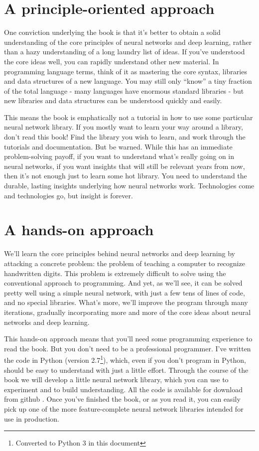 \section*{A principle-oriented approach}

One conviction underlying the book is that it's better to obtain a solid understanding of the core principles of neural networks and deep learning, rather than a hazy understanding of a long laundry list of ideas. If you've understood the core ideas well, you can rapidly understand other new material. In programming language terms, think of it as mastering the core syntax, libraries and data structures of a new language. You may still only ``know'' a tiny fraction of the total language - many languages have enormous standard libraries - but new libraries and data structures can be understood quickly and easily.

This means the book is emphatically not a tutorial in how to use some particular neural network library. If you mostly want to learn your way around a library, don't read this book! Find the library you wish to learn, and work through the tutorials and documentation. But be warned. While this has an immediate problem-solving payoff, if you want to understand what's really going on in neural networks, if you want insights that will still be relevant years from now, then it's not enough just to learn some hot library. You need to understand the durable, lasting insights underlying how neural networks work. Technologies come and technologies go, but insight is forever.

\section*{A hands-on approach}

We'll learn the core principles behind neural networks and deep learning by attacking a concrete problem: the problem of teaching a computer to recognize handwritten digits. This problem is extremely difficult to solve using the conventional approach to programming. And yet, as we'll see, it can be solved pretty well using a simple neural network, with just a few tens of lines of code, and no special libraries. What's more, we'll improve the program through many iterations, gradually incorporating more and more of the core ideas about neural networks and deep learning.

This hands-on approach means that you'll need some programming experience to read the book. But you don't need to be a professional programmer. I've written the code in Python (version 2.7\footnote{Converted to Python 3 in this document}), which, even if you don't program in Python, should be easy to understand with just a little effort. Through the course of the book we will develop a little neural network library, which you can use to experiment and to build understanding. All the code is available for download from github \cite{Nielsengithub2019}. Once you've finished the book, or as you read it, you can easily pick up one of the more feature-complete neural network libraries intended for use in production.

